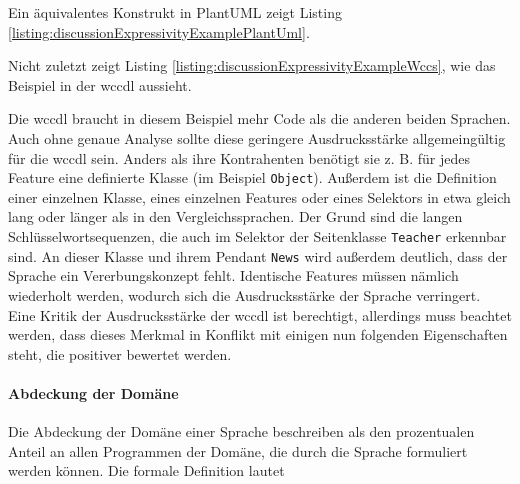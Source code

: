     

    Ein äquivalentes Konstrukt in PlantUML zeigt Listing
    \ref{listing:discussionExpressivityExamplePlantUml}.

    

    Nicht zuletzt zeigt Listing \ref{listing:discussionExpressivityExampleWccs},
    wie das Beispiel in der \gls{wccdl} aussieht.

    

    Die \gls{wccdl} braucht in diesem Beispiel mehr Code als die anderen beiden Sprachen.
    Auch ohne genaue Analyse sollte diese geringere Ausdrucksstärke
    allgemeingültig für die \gls{wccdl} sein.
    Anders als ihre Kontrahenten benötigt sie z. B. für jedes Feature eine definierte Klasse
    (im Beispiel \texttt{Object}).
    Außerdem ist die Definition einer einzelnen Klasse,
    eines einzelnen Features oder eines Selektors in etwa gleich lang oder länger
    als in den Vergleichssprachen.
    Der Grund sind die langen Schlüsselwortsequenzen,
    die auch im Selektor der Seitenklasse \texttt{Teacher}
    erkennbar sind.
    An dieser Klasse und ihrem Pendant \texttt{News}
    wird außerdem deutlich, dass der Sprache ein Vererbungskonzept fehlt.
    Identische Features müssen nämlich wiederholt werden,
    wodurch sich die Ausdrucksstärke der Sprache verringert.
    Eine Kritik der Ausdrucksstärke der \gls{wccdl} ist berechtigt,
    allerdings muss beachtet werden,
    dass dieses Merkmal in Konflikt mit einigen nun folgenden
    Eigenschaften steht, die positiver bewertet werden.


    \paragraph*{Abdeckung der Domäne}
    Die Abdeckung der Domäne einer Sprache beschreiben
    \citet[Kapitel 4.2]{voelter:DslEngineering} als den
    prozentualen Anteil an allen Programmen der Domäne,
    die durch die Sprache formuliert werden können.
    Die formale Definition lautet


